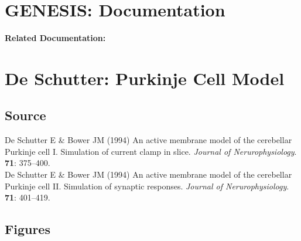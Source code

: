 \documentclass[12pt]{article}
\begin{document}
\section*{GENESIS: Documentation}

{\bf Related Documentation:}

\section*{De Schutter: Purkinje Cell Model}

\subsection*{Source}

De Schutter E \& Bower JM (1994) An active membrane model of the cerebellar Purkinje cell I. Simulation of current clamp in slice. {\it Journal of Nerurophysiology}. {\bf 71}: 375--400. \\

\noindent De Schutter E \& Bower JM (1994) An active membrane model of the cerebellar Purkinje cell II. Simulation of synaptic responses. {\it Journal of Nerurophysiology}. {\bf 71}: 401--419.

\subsection*{Figures}
\end{document}
